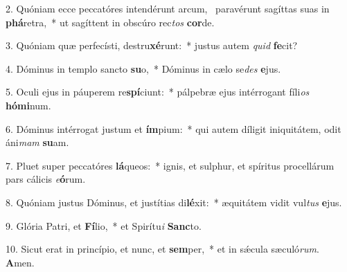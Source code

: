 2. Quóniam ecce peccatóres intendérunt arcum, \dag\  paravérunt sagíttas suas in \textbf{phá}retra,~*  ut sagíttent in obscúro rec\textit{tos} \textbf{cor}de.\

3. Quóniam quæ perfecísti, destru\textbf{xé}runt:~*  justus autem \textit{quid} \textbf{fe}cit?\

4. Dóminus in templo sancto \textbf{su}o,~*  Dóminus in cælo se\textit{des} \textbf{e}jus.\

5. Oculi ejus in páuperem re\textbf{spí}ciunt:~*  pálpebræ ejus intérrogant fíli\textit{os} \textbf{hó}\textbf{mi}num.\

6. Dóminus intérrogat justum et \textbf{ím}pium:~*  qui autem díligit iniquitátem, odit áni\textit{mam} \textbf{su}am.\

7. Pluet super peccatóres \textbf{lá}queos:~*  ignis, et sulphur, et spíritus procellárum pars cálicis \textit{e}\textbf{ó}rum.\

8. Quóniam justus Dóminus, et justítias di\textbf{lé}xit:~*  æquitátem vidit vul\textit{tus} \textbf{e}jus.\

9. Glória Patri, et \textbf{Fí}lio,~*  et Spirítu\textit{i} \textbf{Sanc}to.\

10. Sicut erat in princípio, et nunc, et \textbf{sem}per,~*  et in sǽcula sæculó\textit{rum}. \textbf{A}men.\

